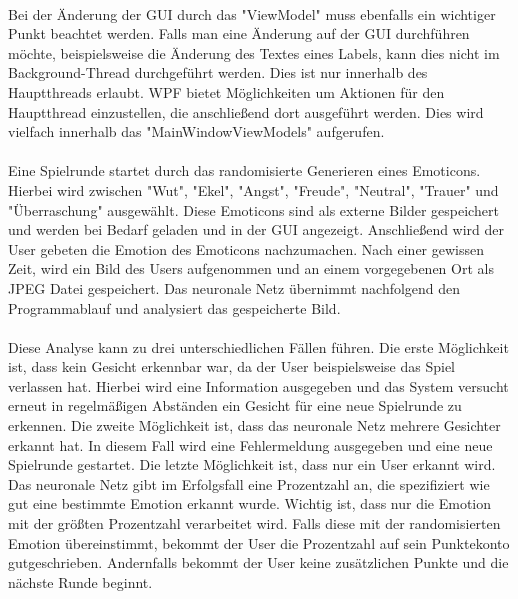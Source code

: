 \documentclass[12pt,a4paper,headinclude,twoside, plainheadsepline, open=right,numbers=noenddot]{scrreprt}
\begin{document}
\paragraph{}
Bei der Änderung der GUI durch das "{}ViewModel"{} muss ebenfalls ein wichtiger Punkt beachtet werden. Falls man eine Änderung auf der GUI durchführen möchte, beispielsweise die Änderung des Textes eines Labels, kann dies nicht im Background-Thread durchgeführt werden. Dies ist nur innerhalb des Hauptthreads erlaubt. WPF bietet Möglichkeiten um Aktionen für den Hauptthread einzustellen, die anschließend dort ausgeführt werden. Dies wird vielfach innerhalb das "{}MainWindowViewModels"{} aufgerufen.
\paragraph{}
Eine Spielrunde startet durch das randomisierte Generieren eines Emoticons. Hierbei wird zwischen "{}Wut"{}, "{}Ekel"{}, "{}Angst"{}, "{}Freude"{}, "{}Neutral"{}, "{}Trauer"{} und "{}Überraschung"{} ausgewählt. Diese Emoticons sind als externe Bilder gespeichert und werden bei Bedarf geladen und in der GUI angezeigt. Anschließend wird der User gebeten die Emotion des Emoticons nachzumachen. Nach einer gewissen Zeit, wird ein Bild des Users aufgenommen und an einem vorgegebenen Ort als JPEG Datei gespeichert. Das neuronale Netz übernimmt nachfolgend den Programmablauf und analysiert das gespeicherte Bild.
\paragraph{}
Diese Analyse kann zu drei unterschiedlichen Fällen führen. Die erste Möglichkeit ist, dass kein Gesicht erkennbar war, da der User beispielsweise das Spiel verlassen hat. Hierbei wird eine Information ausgegeben und das System versucht erneut in regelmäßigen Abständen ein Gesicht für eine neue Spielrunde zu erkennen. Die zweite Möglichkeit ist, dass das neuronale Netz mehrere Gesichter erkannt hat. In diesem Fall wird eine Fehlermeldung ausgegeben und eine neue Spielrunde gestartet. Die letzte Möglichkeit ist, dass nur ein User erkannt wird. Das neuronale Netz gibt im Erfolgsfall eine Prozentzahl an, die spezifiziert wie gut eine bestimmte Emotion erkannt wurde. Wichtig ist, dass nur die Emotion mit der größten Prozentzahl verarbeitet wird. Falls diese mit der randomisierten Emotion übereinstimmt, bekommt der User die Prozentzahl auf sein Punktekonto gutgeschrieben. Andernfalls bekommt der User keine zusätzlichen Punkte und die nächste Runde beginnt.
\end{document}
